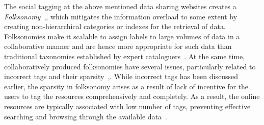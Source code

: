 The social tagging at the above mentioned data sharing websites creates a {\em Folksonomy}~{\cite{HsiehCollab09},\cite{SunLang11},\cite{HyunwooFrame14}} which mitigates the information overload to some extent by creating non-hierarchical categories or indexes for the retrieval of data. Folksonomies make it scalable to assign labels to large volumes of data in a collaborative manner and are hence more appropriate for such data than traditional taxonomies established by expert cataloguers~{\cite{HyunwooFrame14}}. At the same time, collaboratively produced folksonomies have several issues, particularly related to incorrect tags and their sparsity~\cite{SunLang11},\cite{MohdSemantic13}. While incorrect tags has been discussed earlier, the sparsity in folksonomy arises as a result of lack of incentive for the users to tag the resources comprehensively and completely. As a result, the online resources are typically associated with low number of tags, preventing effective searching and browsing through the available data~\cite{MohdSemantic13}. 

